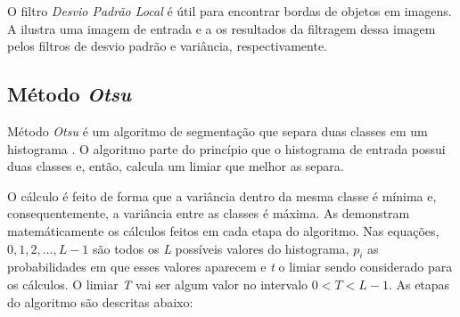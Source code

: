 \par O filtro \textit{Desvio Padrão Local} é útil para encontrar bordas de objetos em imagens. A  ilustra uma imagem de entrada e a  os resultados da filtragem dessa imagem pelos filtros de desvio padrão e variância, respectivamente.





\subsection{Método \textit{Otsu}}\label{sec:dom_esp:otsu}

\par Método \textit{Otsu} é um algoritmo de segmentação que separa duas classes em um histograma \cite{otsumethod}. O algoritmo parte do princípio que o histograma de entrada possui duas classes e, então, calcula um limiar que melhor as separa.

\par O cálculo é feito de forma que a variância dentro da mesma classe é mínima e, consequentemente, a variância entre as classes é máxima. As  demonstram matemáticamente os cálculos feitos em cada etapa do algoritmo. Nas equações, ${0, 1, 2, ..., L - 1}$ são todos os \textit{L} possíveis valores do histograma, $p_{i}$ as probabilidades em que esses valores aparecem e \textit{t} o limiar sendo considerado para os cálculos. O limiar \textit{T} vai ser algum valor no intervalo $0 < T < L - 1$. As etapas do algoritmo são descritas abaixo:

